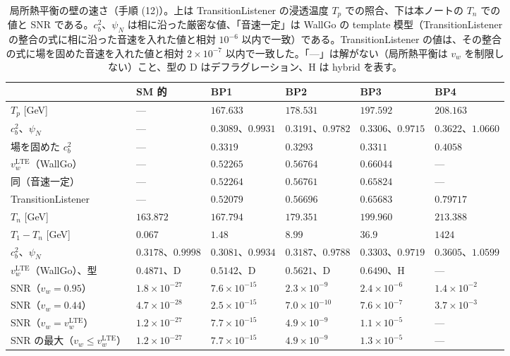 \documentclass[a4paper,10pt]{ltjsarticle}
\begin{document}
\begin{table}[tbp]
\centering\small
\caption{局所熱平衡の壁の速さ（手順 (12)）。上は TransitionListener の浸透温度 $T_p$ での照合、下は本ノートの $T_n$ での値と SNR である。$c_b^2$、$\psi_N$ は相に沿った厳密な値、「音速一定」は WallGo の template 模型（TransitionListener の整合の式に相に沿った音速を入れた値と相対 $10^{-6}$ 以内で一致）である。TransitionListener の値は、その整合の式に場を固めた音速を入れた値と相対 $2\times10^{-7}$ 以内で一致した。「—」は解がない（局所熱平衡は $v_w$ を制限しない）こと、型の D はデフラグレーション、H は hybrid を表す。}
\label{tab:wallgo}
\begin{tabular}{llllll}
\toprule
 & SM 的 & BP1 & BP2 & BP3 & BP4 \\
\midrule
$T_p$ [GeV] & — & $167.633$ & $178.531$ & $197.592$ & $208.163$ \\
$c_b^2$、$\psi_N$ & — & $0.3089$、$0.9931$ & $0.3191$、$0.9782$ & $0.3306$、$0.9715$ & $0.3622$、$1.0660$ \\
場を固めた $c_b^2$ & — & $0.3319$ & $0.3293$ & $0.3311$ & $0.4058$ \\
$v_w^{\mathrm{LTE}}$（WallGo） & — & $0.52265$ & $0.56764$ & $0.66044$ & — \\
同（音速一定） & — & $0.52264$ & $0.56761$ & $0.65824$ & — \\
TransitionListener & — & $0.52079$ & $0.56696$ & $0.65683$ & $0.79717$ \\
\midrule
$T_n$ [GeV] & $163.872$ & $167.794$ & $179.351$ & $199.960$ & $213.388$ \\
$T_1-T_n$ [GeV] & $0.067$ & $1.48$ & $8.99$ & $36.9$ & $1424$ \\
$c_b^2$、$\psi_N$ & $0.3178$、$0.9998$ & $0.3081$、$0.9934$ & $0.3187$、$0.9788$ & $0.3303$、$0.9719$ & $0.3605$、$1.0599$ \\
$v_w^{\mathrm{LTE}}$（WallGo）、型 & $0.4871$、D & $0.5142$、D & $0.5621$、D & $0.6490$、H & — \\
SNR（$v_w=0.95$） & $1.8\times10^{-27}$ & $7.6\times10^{-15}$ & $2.3\times10^{-9}$ & $2.4\times10^{-6}$ & $1.4\times10^{-2}$ \\
SNR（$v_w=0.44$） & $4.7\times10^{-28}$ & $2.5\times10^{-15}$ & $7.0\times10^{-10}$ & $7.6\times10^{-7}$ & $3.7\times10^{-3}$ \\
SNR（$v_w=v_w^{\mathrm{LTE}}$） & $1.2\times10^{-27}$ & $7.7\times10^{-15}$ & $4.9\times10^{-9}$ & $1.1\times10^{-5}$ & — \\
SNR の最大（$v_w\le v_w^{\mathrm{LTE}}$） & $1.2\times10^{-27}$ & $7.7\times10^{-15}$ & $4.9\times10^{-9}$ & $1.3\times10^{-5}$ & — \\
\bottomrule
\end{tabular}
\end{table}
\end{document}
